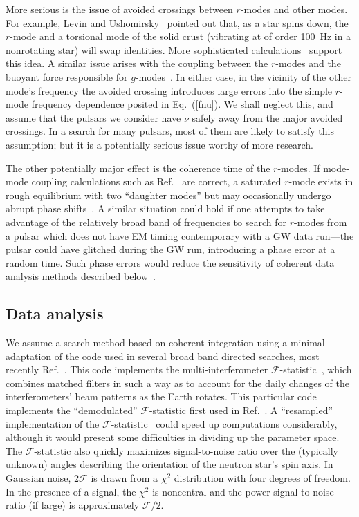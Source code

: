 \documentclass{ttuthes2007}
\begin{document}
More serious is the issue of avoided crossings between $r$-modes and other
modes.
For example, Levin and Ushomirsky~\cite{Levin:2000vq} pointed out that, as a
star spins down, the $r$-mode and a torsional mode of the solid crust
(vibrating at of order 100~Hz in a nonrotating star) will swap identities.
More sophisticated calculations~\cite[e.g.]{Glampedakis:2006ap} support this
idea.
A similar issue arises with the coupling between the $r$-modes and the buoyant
force responsible for $g$-modes~\cite{Kantor:2017xuo}.
In either case, in the vicinity of the other mode's frequency the avoided
crossing introduces large errors into the simple $r$-mode frequency dependence
posited in Eq.~(\ref{fnu}).
We shall neglect this, and assume that the pulsars we consider have $\nu$
safely away from the major avoided crossings.
In a search for many pulsars, most of them are likely to satisfy this
assumption; but it is a potentially serious issue worthy of more research.

The other potentially major effect is the coherence time of the $r$-modes.
If mode-mode coupling calculations such as Ref.~\cite{Brink:2004kt} are
correct, a saturated $r$-mode exists in rough equilibrium with two ``daughter
modes'' but may occasionally undergo abrupt phase shifts~\cite{Ira}.
A similar situation could hold if one attempts to take advantage of the
relatively broad band of frequencies to search for $r$-modes from a pulsar
which does not have \ac{EM} timing contemporary with a \ac{GW} data run---the
pulsar could have glitched during the \ac{GW} run, introducing a phase error
at a random time.
Such phase errors would reduce the sensitivity of coherent data analysis
methods described below~\cite{Ashton:2017wui}.

\subsection{Data analysis}

We assume a search method based on coherent integration using a minimal
adaptation of the code used in several broad band directed searches, most
recently Ref.~\cite{Abbott:2018qee}.
This code implements the multi-interferometer
$\mathcal{F}$-statistic~\cite{Jaranowski:1998qm, Cutler:2005hc}, which
combines matched filters in such a way as to account for the daily changes of
the interferometers' beam patterns as the Earth rotates.
This particular code implements the ``demodulated'' $\mathcal{F}$-statistic
first used in Ref.~\cite{Abbott:2003yq}.
A ``resampled'' implementation of the
$\mathcal{F}$-statistic~\cite{Patel:2009qe} could speed up computations
considerably, although it would present some difficulties in dividing up the
parameter space.
The $\mathcal{F}$-statistic also quickly maximizes signal-to-noise ratio over
the (typically unknown) angles describing the orientation of the neutron
star's spin axis.
In Gaussian noise, $2\mathcal{F}$ is drawn from a $\chi^2$ distribution with
four degrees of freedom.
In the presence of a signal, the $\chi^2$ is noncentral and the power
signal-to-noise ratio (if large) is approximately $\mathcal{F}/2.$
\end{document}
